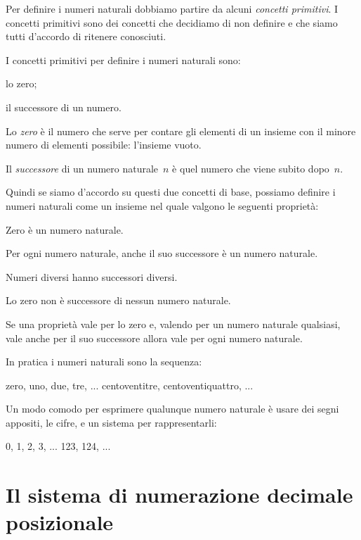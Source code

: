 Per definire i numeri naturali dobbiamo partire da alcuni 
\emph{concetti primitivi}. 
I concetti primitivi sono dei concetti che decidiamo di non definire e che 
siamo tutti d'accordo di ritenere conosciuti.

I concetti primitivi per definire i numeri naturali sono:

\begin{itemize*}
 \item lo zero;
 \item il successore di un numero.
\end{itemize*}

Lo \emph{zero} è il numero che serve per contare gli elementi di un insieme 
con il minore numero di elementi possibile: l'insieme vuoto.

Il \emph{successore} di un numero naturale~\(n\) è quel numero che viene 
subito 
dopo~\(n\).

Quindi se siamo d'accordo su questi due concetti di base, possiamo definire 
i numeri naturali come un insieme nel quale valgono le seguenti proprietà:

\begin{enumerate*}
 \item Zero è un numero naturale.
 \item Per ogni numero naturale, anche il suo successore è un numero 
naturale.
 \item Numeri diversi hanno successori diversi.
 \item Lo zero non è successore di nessun numero naturale.
 \item Se una proprietà vale per lo zero e, 
   valendo per un numero naturale qualsiasi, 
   vale anche per il suo successore 
   allora vale per ogni numero naturale.
\end{enumerate*}

In pratica i numeri naturali sono la sequenza:

 zero, uno, due, tre, ... centoventitre, centoventiquattro, ...

Un modo comodo per esprimere qualunque numero naturale è usare dei segni 
appositi, le cifre, e un sistema per rappresentarli:

 0, 1, 2, 3, ... 123, 124, ...

\section{Il sistema di numerazione decimale posizionale}
\label{sec:01_sist10}

